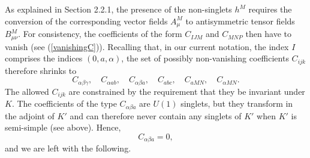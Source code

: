\documentclass[a4paper,11pt]{article}
\begin{document}
As explained in Section 2.2.1, the presence of the non-singlets
$h^{M}$ requires the conversion of the corresponding vector fields
$A_{\mu}^{M}$ to antisymmetric tensor fields $B_{\mu\nu}^{M}$. For
consistency, the coefficients of the form $C_{IJM}$ and $C_{MNP}$
then have to vanish (see (\ref{vanishingC})).
Recalling that, in our current notation, the index $I$ comprises
the indices $(0,a,\alpha)$, the set of possibly non-vanishing
coefficients $C_{ijk}$ therefore shrinks to
\begin{displaymath}
C_{\alpha\beta\gamma}, \quad C_{\alpha ab}, \quad C_{\alpha \beta
a}, \quad C_{abc}, \quad C_{a MN}, \quad C_{\alpha MN}.
\end{displaymath}
The allowed $C_{ijk}$ are constrained by the requirement that they
be invariant under $K$. The coefficients of the type $C_{\alpha\beta a}$
are $U(1)$ singlets, but they transform in the adjoint of $K'$ and
can therefore never contain any singlets of $K'$ when $K'$ is
semi-simple (see above). Hence,
\begin{displaymath}
C_{\alpha\beta a}=0,
\end{displaymath}
and we are left with the following.
\end{document}
